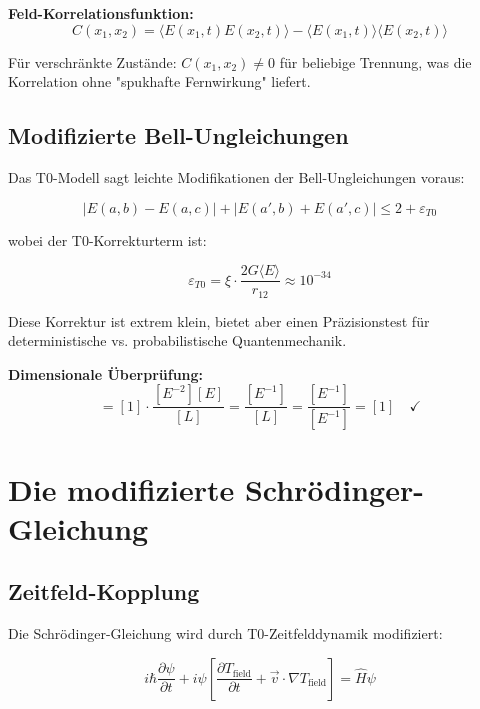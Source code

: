 \documentclass[12pt,a4paper]{report}
\begin{document}
	\textbf{Feld-Korrelationsfunktion:}
	\begin{equation}
		C(x_1,x_2) = \langle E(x_1,t) E(x_2,t) \rangle - \langle E(x_1,t) \rangle \langle E(x_2,t) \rangle
	\end{equation}
	
	Für verschränkte Zustände: $C(x_1,x_2) \neq 0$ für beliebige Trennung, was die Korrelation ohne "spukhafte Fernwirkung" liefert.
	
	\subsection{Modifizierte Bell-Ungleichungen}
	\label{subsec:modified_bell_inequalities}
	
	Das T0-Modell sagt leichte Modifikationen der Bell-Ungleichungen voraus:
	
	\begin{equation}
		|E(a,b) - E(a,c)| + |E(a',b) + E(a',c)| \leq 2 + \varepsilon_{T0}
	\end{equation}
	
	wobei der T0-Korrekturterm ist:
	
	\begin{equation}
		\varepsilon_{T0} = \xi \cdot \frac{2G\langle E \rangle}{r_{12}} \approx 10^{-34}
	\end{equation}
	
	Diese Korrektur ist extrem klein, bietet aber einen Präzisionstest für deterministische vs. probabilistische Quantenmechanik.
	
	\textbf{Dimensionale Überprüfung:}
	\begin{equation}
		[\varepsilon_{T0}] = [1] \cdot \frac{[E^{-2}][E]}{[L]} = \frac{[E^{-1}]}{[L]} = \frac{[E^{-1}]}{[E^{-1}]} = [1] \quad \checkmark
	\end{equation}
	
	\section{Die modifizierte Schrödinger-Gleichung}
	\label{sec:modified_schrodinger}
	
	\subsection{Zeitfeld-Kopplung}
	\label{subsec:time_field_coupling}
	
	Die Schrödinger-Gleichung wird durch T0-Zeitfelddynamik modifiziert:
	
	\begin{equation}
		\boxed{i \hbar \frac{\partial\psi}{\partial t} + i\psi\left[\frac{\partial T_{\text{field}}}{\partial t} + \vec{v} \cdot \nabla T_{\text{field}}\right] = \hat{H}\psi}
		\label{eq:modified_schrodinger}
	\end{equation}
	
\end{document}
